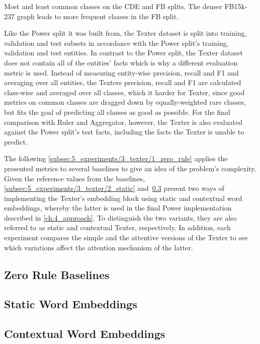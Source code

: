 \begin{table}[h]
    \centering
    
    \caption{Most and least common classes on the CDE and FB splits. The denser FB15k-237 graph leads to more frequent classes in the FB split.}
    \label{tab:5_experiments/3_texter/classes}
\end{table}

Like the Power split it was built from, the Texter dataset is split into training, validation and test subsets in accordance with the Power split's training, validation and test entities. In contrast to the Power split, the Texter dataset does not contain all of the entities' facts which is why a different evaluation metric is used. Instead of measuring entity-wise precision, recall and F1 and averaging over all entities, the Texters precision, recall and F1 are calculated class-wise and averaged over all classes, which it harder for Texter, since good metrics on common classes are dragged down by equally-weighted rare classes, but fits the goal of predicting all classes as good as possible. For the final comparison with Ruler and Aggregator, however, the Texter is also evaluated against the Power split's test facts, including the facts the Texter is unable to predict.

The following \autoref{subsec:5_experiments/3_texter/1_zero_rule} applies the presented metrics to several baselines to give an idea of the problem's complexity. Given the reference values from the baselines, \autoref{subsec:5_experiments/3_texter/2_static} and~\ref{subsec:5_experiments/3_texter/3_context} present two ways of implementing the Texter's embedding block using static and contextual word embeddings, whereby the latter is used in the final Power implementation described in \autoref{ch:4_approach}. To distinguish the two variants, they are also referred to as static and contextual Texter, respectively. In addition, each experiment compares the simple and the attentive versions of the Texter to see which variations affect the attention mechanism of the latter.

\subsection{Zero Rule Baselines}
\label{subsec:5_experiments/3_texter/1_zero_rule}


\subsection{Static Word Embeddings}
\label{subsec:5_experiments/3_texter/2_static}


\subsection{Contextual Word Embeddings}
\label{subsec:5_experiments/3_texter/3_context}

